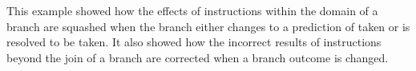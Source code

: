 This example showed how the effects of instructions within the
domain of a branch are squashed when the branch either
changes to a prediction of taken or is resolved to be taken.
It also showed how the incorrect results of instructions beyond the
join of a branch are corrected when a branch outcome is changed.
